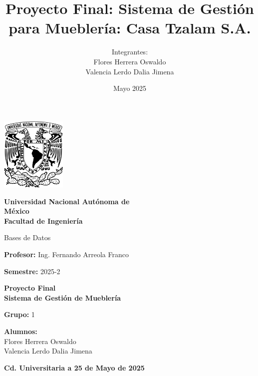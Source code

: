 \documentclass[a4paper, 12pt]{article}
\title{Proyecto Final: Sistema de Gestión para Mueblería: Casa Tzalam S.A.}
\author{Integrantes: \\ Flores Herrera Oswaldo \\ Valencia Lerdo Dalia Jimena}
\date{Mayo 2025}
\begin{document}
\begin{titlepage}
    \centering
    
    \includegraphics[height=3.5cm]{escudo-unam.png}
    \vspace{0.5cm}
    
    {\LARGE\textbf{Universidad Nacional Autónoma de}}\\[0.5cm]
    {\LARGE\textbf{México}}\\
    \vspace{0.3cm}
    {\Large\textbf{Facultad de Ingeniería}}
    \vspace{1cm}
    
    {\Large Bases de Datos}\\
    \vspace{0.5cm}
    
    \Large\textbf{Profesor:} Ing. Fernando Arreola Franco\\
    \vspace{0.5cm}
    
    \Large\textbf{Semestre:} 2025-2\\
    \vspace{1cm}
    
    {\Large \textbf{Proyecto Final}}\\
    \vspace{0.3cm}
    {\LARGE \textbf{Sistema de Gestión de Mueblería}}\\
    \vspace{1cm}
    
    \Large\textbf{Grupo:} 1\\
    \vspace{0.8cm}
    
    \Large\textbf{Alumnos:}\\
    Flores Herrera Oswaldo\\
    Valencia Lerdo Dalia Jimena\\
    \vspace{1cm}
    
    \begin{flushleft}
    \small\textbf{Cd. Universitaria a 25 de Mayo de 2025}
    \end{flushleft}
\end{titlepage}
 
\end{document}
